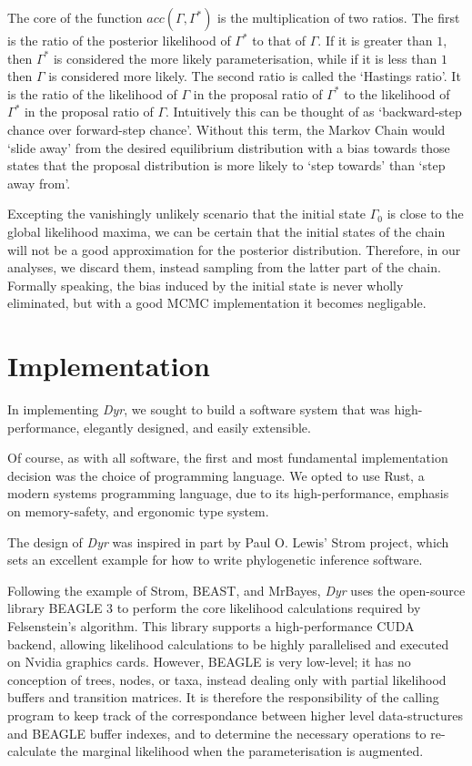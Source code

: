 \documentclass[10pt,journal,compsoc]{IEEEtran}
\begin{document}
The core of the function $acc(\Gamma, \Gamma^*)$ is the multiplication of two ratios. The first is the ratio of the posterior likelihood of $\Gamma^*$ to that of $\Gamma$. If it is greater than $1$, then $\Gamma^*$ is considered the more likely parameterisation, while if it is less than $1$ then $\Gamma$ is considered more likely. The second ratio is called the `Hastings ratio'. It is the ratio of the likelihood of $\Gamma$ in the proposal ratio of $\Gamma^*$ to the likelihood of $\Gamma^*$ in the proposal ratio of $\Gamma$. Intuitively this can be thought of as `backward-step chance over forward-step chance'. Without this term, the Markov Chain would `slide away' from the desired equilibrium distribution with a bias towards those states that the proposal distribution is more likely to `step towards' than `step away from'.

Excepting the vanishingly unlikely scenario that the initial state $\Gamma_0$ is close to the global likelihood maxima, we can be certain that the initial states of the chain will not be a good approximation for the posterior distribution. Therefore, in our analyses, we discard them, instead sampling from the latter part of the chain. Formally speaking, the bias induced by the initial state is never wholly eliminated, but with a good MCMC implementation it becomes negligable.

\section{Implementation}

In implementing \textit{Dyr}, we sought to build a software system that was high-performance, elegantly designed, and easily extensible.

Of course, as with all software, the first and most fundamental implementation decision was the choice of programming language. We opted to use Rust, a modern systems programming language, due to its high-performance, emphasis on memory-safety, and ergonomic type system.

The design of \textit{Dyr} was inspired in part by Paul O. Lewis' Strom project, which sets an excellent example for how to write phylogenetic inference software.

Following the example of Strom, BEAST, and MrBayes, \textit{Dyr} uses the open-source library BEAGLE 3 to perform the core likelihood calculations required by Felsenstein's algorithm. This library supports a high-performance CUDA backend, allowing likelihood calculations to be highly parallelised and executed on Nvidia graphics cards. However, BEAGLE is very low-level; it has no conception of trees, nodes, or taxa, instead dealing only with partial likelihood buffers and transition matrices. It is therefore the responsibility of the calling program to keep track of the correspondance between higher level data-structures and BEAGLE buffer indexes, and to determine the necessary operations to re-calculate the marginal likelihood when the parameterisation is augmented.
\end{document}
